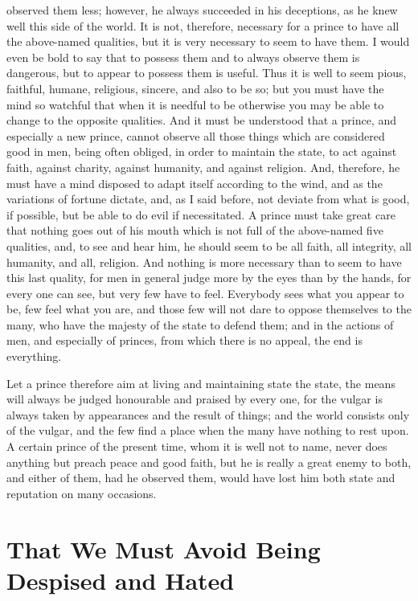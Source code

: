 \documentclass[12pt,letterpaper]{memoir}
\begin{document}
observed them less; however, he always succeeded in his deceptions, as
he knew well this side of the world. It is not, therefore, necessary
for a prince to have all the above-named qualities, but it is very
necessary to seem to have them. I would even be bold to say that to
possess them and to always observe them is dangerous, but to appear
to possess them is useful. Thus it is well to seem pious, faithful,
humane, religious, sincere, and also to be so; but you must have the
mind so watchful that when it is needful to be otherwise you may be
able to change to the opposite qualities. And it must be understood
that a prince, and especially a new prince, cannot observe all those
things which are considered good in men, being often obliged, in order
to maintain the state, to act against faith, against charity, against
humanity, and against religion. And, therefore, he must have a mind
disposed to adapt itself according to the wind, and as the variations
of fortune dictate, and, as I said before, not deviate from what is
good, if possible, but be able to do evil if necessitated. A prince
must take great care that nothing goes out of his mouth which is not
full of the above-named five qualities, and, to see and hear him, he
should seem to be all faith, all integrity, all humanity, and all,
religion. And nothing is more necessary than to seem to have this last
quality, for men in general judge more by the eyes than by the hands,
for every one can see, but very few have to feel. Everybody sees what
you appear to be, few feel what you are, and those few will not dare
to oppose themselves to the many, who have the majesty of the state to
defend them; and in the actions of men, and especially of princes, from
which there is no appeal, the end is everything.

Let a prince therefore aim at living and maintaining state the state,
the means will always be judged honourable and praised by every one,
for the vulgar is always taken by appearances and the result of things;
and the world consists only of the vulgar, and the few find a place
when the many have nothing to rest upon. A certain prince of the
present time, whom it is well not to name, never does anything but
preach peace and good faith, but he is really a great enemy to both,
and either of them, had he observed them, would have lost him both
state and reputation on many occasions.

\chapter{That We Must Avoid Being Despised and Hated}
\end{document}
